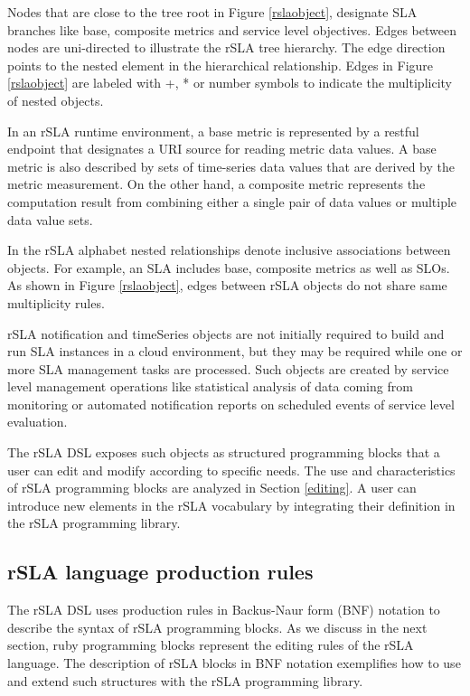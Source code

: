 Nodes that are close to the tree root in Figure \ref{rslaobject}, designate SLA branches like base, composite metrics and service level objectives. Edges between nodes are uni-directed to illustrate the rSLA tree hierarchy. The edge direction points to the nested element in the hierarchical relationship. 
Edges in Figure \ref{rslaobject} are labeled with +, * or number symbols to indicate the multiplicity of nested objects. 

In an rSLA runtime environment, a base metric is represented by a restful endpoint that designates a URI source for reading metric data values. A base metric is also described by sets of time-series data values that are derived by the metric measurement. On the other hand, a composite metric represents the computation result from combining either a single pair of data values or multiple data value sets. 

In the rSLA alphabet nested relationships denote inclusive associations between objects. For example, an SLA includes base, composite metrics as well as SLOs. As shown in Figure \ref{rslaobject}, edges between  rSLA objects do not share same multiplicity rules. 

rSLA notification and timeSeries objects are not initially required to build and run SLA instances in a cloud environment, but they may be required while one or more SLA management tasks are processed. Such objects are created by service level management operations like statistical analysis of data coming from monitoring or automated notification reports on scheduled events of service level evaluation. 

The rSLA DSL exposes such objects as structured programming blocks that a user can edit and modify according to specific needs. The use and characteristics of rSLA programming blocks are analyzed in Section \ref{editing}. A user can introduce new elements in the rSLA vocabulary by integrating their definition in the rSLA programming library. 

\subsection{rSLA language production rules}

The rSLA DSL uses production rules in Backus-Naur form (BNF) notation to describe the syntax of rSLA programming blocks. As we discuss in the next section, ruby programming blocks represent the editing rules of the rSLA language. The description of rSLA blocks in BNF notation exemplifies how to use and extend such structures with the rSLA programming library.

